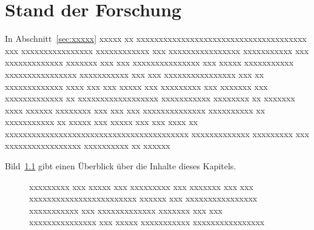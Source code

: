 %
\chapter{Stand der Forschung}\label{chap:StandForschungTechnik}
In Abschnitt~\ref{sec:xxxxx} xxxxx xx xxxxxxxxxxxxxxxxxxxxxxxxxxxxxxxxxxxxxx xxx xxxxxxxxxxxxxxxx xxxxxxxxxxxx xxx xxxxxxxxxxxxxxxx xxxxxxxxxxx xxx xxxxxxxxxxxxx xxxxxxx xxx xxx xxxxxxxxxxxxxxx xxx xxxxx xxxxxxxxxxx xxxxxxxxxxxxxxxx xxxxxxxxxxx xxx xxx xxxxxxxxxxxxxxxx xxx xx xxxxxxxxxxxxx xxxx xxx xxx xxxxx xxx xxxxxxxxx xxx xxxxxxx xxx xxxxxxxxxxxxx xx xxxxxxxxxxxxxxxxxx xxxxxxxxxxx xxxxxxxx xx xxxxxxx xxxx xxxxxx xxxxxxxx xxx xxx xxx xxxxxxxxxxxxxx xxxxxxxxxx xx xxxxxxxxxxx xx xxxxx xxx xxxxx xxx xxx xxxx xx xxxxxxxxxxxxxxxxxxxxxxxxxxxxxxxxxxxxxxxxx xxxxxxxxxxxxx \cite{KEYH} xxxxxxxxx xxx xxxxxxxxxxxxxxxxx xxxxxxxxxx xx xxxxxx

Bild~\ref{fig:xxxx} gibt einen Überblick über die Inhalte dieses Kapitels.
\begin{figure}
	\centering
	\caption[Ggf. Kurztitel für Bildverzeichnis]{xxxxxxxxx xxx xxxxx xxx xxxxxxxxx xxx xxxxxxx xxx xxx xxxxxxxxxxxxxxxxxxxxxxxx xxxxxx xxx xxxxxxxxxxxxxxxx xxxxxxxxxxx xxx xxxxxxxxxxxxx xxxxxxx xxx xxx xxxxxxxxxxxxxxx xxx xxxxx xxxxxxxxxxx xxxxxxxxxxxxxxxx}
  \label{fig:xxxx}
\end{figure}

